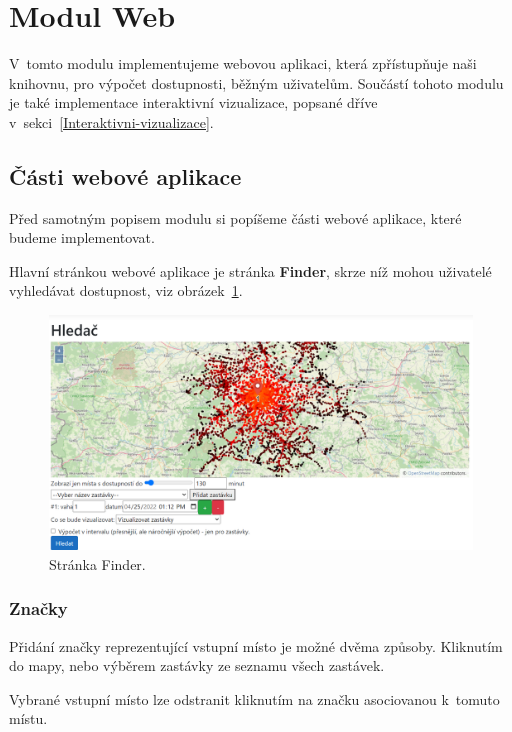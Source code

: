 \section{Modul Web}

V~tomto modulu implementujeme webovou aplikaci, která zpřístupňuje naši knihovnu, pro výpočet dostupnosti, běžným uživatelům. Součástí tohoto modulu je také implementace interaktivní vizualizace, popsané dříve v~sekci~\ref{Interaktivni-vizualizace}.

\subsection{Části webové aplikace}

Před samotným popisem modulu si popíšeme části webové aplikace, které budeme implementovat.

Hlavní stránkou webové aplikace je stránka \textbf{Finder}, skrze níž mohou uživatelé vyhledávat dostupnost, viz obrázek~\ref{fig:Finder}.

\begin{figure}[ht]
    \centering
    \includegraphics[width=\textwidth]{../img/finder.png}
    \caption{Stránka Finder.}
    \label{fig:Finder}
\end{figure}

\subsubsection{Značky}

Přidání značky reprezentující vstupní místo je možné dvěma způsoby. Kliknutím do mapy, nebo výběrem zastávky ze seznamu všech zastávek.

Vybrané vstupní místo lze odstranit kliknutím na značku asociovanou k~tomuto místu.

